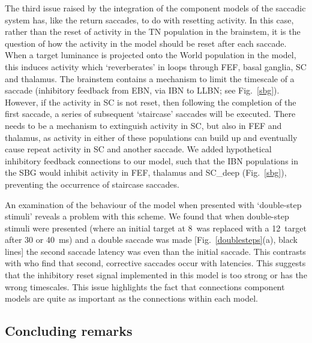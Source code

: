 \documentclass{frontiersSCNS}
\begin{document}
The third issue raised by the integration of the component models of
the saccadic system has, like the return saccades, to do with resetting
activity. In this case, rather than the reset of activity in the TN
population in the brainstem, it is the question of how the activity
in the  model should be reset after each saccade. When a target
luminance is projected onto the World population in the model, this
induces activity which `reverberates' in loops through FEF, basal
ganglia, SC and thalamus. The brainstem contains a mechanism to limit
the timescale of a saccade (inhibitory feedback from EBN, via IBN to
LLBN; see Fig.~\ref{sbg}). However, if the activity in SC is not
reset, then following the completion of the first saccade, a series
of subsequent `staircase' saccades will be executed. There needs to
be a mechanism to extinguish activity in SC, but also in FEF and
thalamus, as activity in either of these populations can build up
and eventually cause repeat activity in SC and another saccade. We
added hypothetical inhibitory feedback connections to our model,
such that the IBN populations in the SBG would inhibit activity in
FEF, thalamus and SC\_deep (Fig.~\ref{sbg}), preventing the
occurrence of staircase saccades.

An examination of the behaviour of the model when presented with
`double-step stimuli' reveals a problem with this scheme. We found
that when double-step stimuli were presented (where an initial
target at 8\dg~was replaced with a 12\dg~target after 30 or 40~ms)
and a double saccade was made [Fig.~\ref{doublesteps}(a), black
lines] the second saccade latency was  even than the
initial saccade. This contrasts with \cite{becker_analysis_1979} who
find that second, corrective saccades occur with  latencies.
This suggests that the inhibitory reset signal implemented in
this model is too strong or has the wrong timescales. This issue
highlights the fact that connections  component models
are quite as important as the connections within each model.

\subsection{Concluding remarks}
\end{document}
